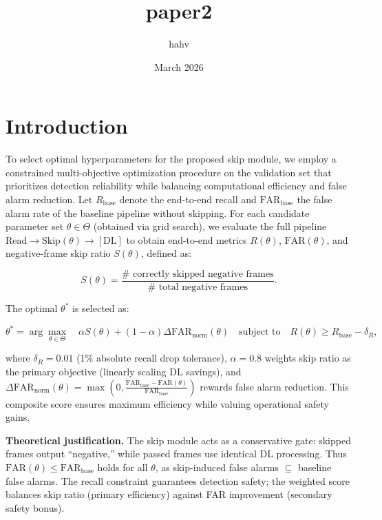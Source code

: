 \documentclass{article}
\title{paper2}
\author{hahv}
\date{March 2026}
\begin{document}
	\maketitle

	\section{Introduction}
	To select optimal hyperparameters for the proposed skip module, we employ a constrained multi-objective optimization procedure on the validation set that prioritizes detection reliability while balancing computational efficiency and false alarm reduction. Let $R_{\text{base}}$ denote the end-to-end recall and $\text{FAR}_{\text{base}}$ the false alarm rate of the baseline pipeline without skipping. For each candidate parameter set $\theta \in \Theta$ (obtained via grid search), we evaluate the full pipeline $\text{Read} \to \text{Skip}(\theta) \to [\text{DL}]$ to obtain end-to-end metrics $R(\theta)$, $\text{FAR}(\theta)$, and negative-frame skip ratio $S(\theta)$, defined as:

	$$S(\theta) = \frac{\# \text{ correctly skipped negative frames}}{\# \text{ total negative frames}}.$$

	The optimal $\theta^*$ is selected as:

	$$\theta^* = \arg\max_{\theta \in \Theta} \quad \alpha S(\theta) + (1-\alpha) \Delta\text{FAR}_{\text{norm}}(\theta) \quad \text{subject to} \quad R(\theta) \ge R_{\text{base}} - \delta_R,$$

	where $\delta_R = 0.01$ (1\% absolute recall drop tolerance), $\alpha=0.8$ weights skip ratio as the primary objective (linearly scaling DL savings), and $\Delta\text{FAR}_{\text{norm}}(\theta) = \max\left(0, \frac{\text{FAR}_{\text{base}}-\text{FAR}(\theta)}{\text{FAR}_{\text{base}}}\right)$ rewards false alarm reduction. This composite score ensures maximum efficiency while valuing operational safety gains.

	\textbf{Theoretical justification.} The skip module acts as a conservative gate: skipped frames output ``negative,'' while passed frames use identical DL processing. Thus $\text{FAR}(\theta) \le \text{FAR}_{\text{base}}$ holds for all $\theta$, as skip-induced false alarms $\subseteq$ baseline false alarms. The recall constraint guarantees detection safety; the weighted score balances skip ratio (primary efficiency) against FAR improvement (secondary safety bonus).
\end{document}
